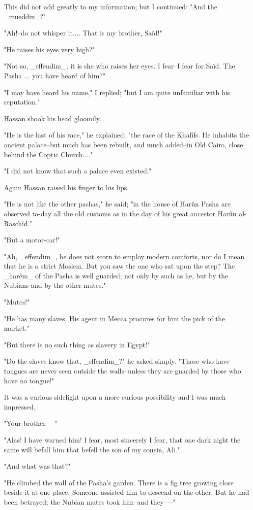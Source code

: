 This did not add greatly to my information; but I continued: "And
the _mueddin_?"

"Ah!--do not whisper it.... That is my brother, Saïd!"

"He raises his eyes very high?"

"Not so, _effendim_; it is she who raises her eyes. I fear--I fear
for Saïd. The Pasha ... you have heard of him?"

"I may have heard his name," I replied; "but I am quite unfamiliar
with his reputation."

Hassan shook his head gloomily.

"He is the last of his race," he explained; "the race of the Khalîfs.
He inhabits the ancient palace--but much has been rebuilt, and much
added--in Old Cairo, close behind the Coptic Church...."

"I did not know that such a palace even existed."

Again Hassan raised his finger to his lips.

"He is not like the other pashas," he said; "in the house of Harûn
Pasha are observed to-day all the old customs as in the day of his
great ancestor Harûn al-Raschîd."

"But a motor-car!"

"Ah, _effendim_, he does not scorn to employ modern comforts, nor do
I mean that he is a strict Moslem. But you saw the one who sat upon
the step? The _harêm_ of the Pasha is well guarded; not only by such
as he, but by the Nubians and by the other mutes."

"Mutes!"

"He has many slaves. His agent in Mecca procures for him the pick of
the market."

"But there is no such thing as slavery in Egypt!"

"Do the slaves know that, _effendim_?" he asked simply. "Those who
have tongues are never seen outside the walls--unless they are guarded
by those who have no tongue!"

It was a curious sidelight upon a more curious possibility and I was
much impressed.

"Your brother----"

"Alas! I have warned him! I fear, most sincerely I fear, that one dark
night the same will befall him that befell the son of my cousin, Ali."

"And what was that?"

"He climbed the wall of the Pasha's garden. There is a fig tree
growing close beside it at one place. Someone assisted him to descend
on the other. But he had been betrayed; the Nubian mutes took him--and
they----"

